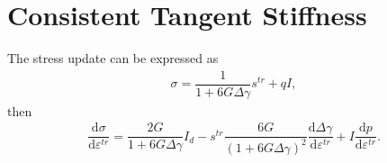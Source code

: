 \documentclass[10pt,fleqn,3p]{elsarticle}
\newcommand*{\md}[1]{\mathrm{d}#1}
\newcommand*{\ddfrac}[2]{\dfrac{\md#1}{\md#2}}
\begin{document}
\section{Consistent Tangent Stiffness}
The stress update can be expressed as
\begin{gather*}
\sigma=\dfrac{1}{1+6G\Delta\gamma}s^{tr}+qI,
\end{gather*}
then
\begin{gather*}
\ddfrac{\sigma}{\varepsilon^{tr}}=\dfrac{2G}{1+6G\Delta\gamma}I_d-s^{tr}\dfrac{6G}{\left(1+6G\Delta\gamma\right)^2}\ddfrac{\Delta\gamma}{\varepsilon^{tr}}+I\ddfrac{p}{\varepsilon^{tr}}.
\end{gather*}
\end{document}
